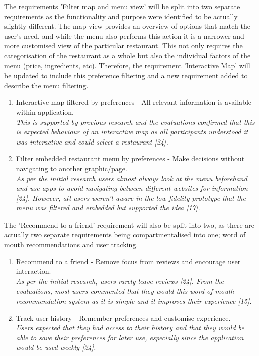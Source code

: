 \documentclass[a4 paper, 12pt]{article}
\begin{document}
    The requirements 'Filter map and menu view' will be split into two separate requirements as the functionality and purpose were identified to be actually slightly different. The map view provides an overview of options that match the user's need, and while the menu also performs this action it is a narrower and more customised view of the particular restaurant. This not only requires the categorisation of the restaurant as a whole but also the individual factors of the menu (price, ingredients, etc). Therefore, the requirement 'Interactive Map' will be updated to include this preference filtering and a new requirement added to describe the menu filtering.
        \begin{enumerate}[resume]
            \item Interactive map filtered by preferences - All relevant information is available within application. \\
                \textit{This is supported by previous research and the evaluations confirmed that this is expected behaviour of an interactive map as all participants understood it was interactive and could select a restaurant [24].}
            \item Filter embedded restaurant menu by preferences - Make decisions without navigating to another graphic/page. \\
                \textit{As per the initial research users almost always look at the menu beforehand and use apps to avoid navigating between different websites for information [24]. However, all users weren't aware in the low fidelity prototype that the menu was filtered and embedded but supported the idea [17].}
        \end{enumerate}

    The 'Recommend to a friend' requirement will also be split into two, as there are actually two separate requirements being compartmentalised into one; word of mouth recommendations and user tracking. 
        \begin{enumerate}[resume]
            \item Recommend to a friend - Remove focus from reviews and encourage user interaction. \\
                \textit{As per the initial research, users rarely leave reviews [24]. From the evaluations, most users commented that they would this word-of-mouth recommendation system as it is simple and it improves their experience [15].}
            \item Track user history - Remember preferences and customise experience. \\
                \textit{Users expected that they had access to their history and that they would be able to save their preferences for later use, especially since the application would be used weekly [24].}
        \end{enumerate}
 
\end{document}
